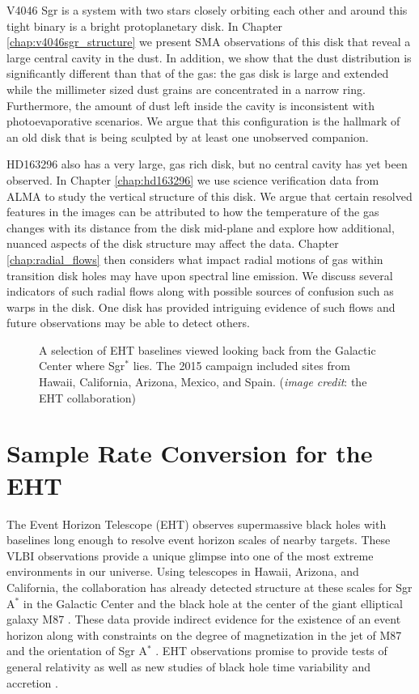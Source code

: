 V4046 Sgr is a system with two stars closely orbiting each other and around this tight binary is a bright
protoplanetary disk.  In Chapter \ref{chap:v4046sgr_structure} we present SMA observations 
of this disk that reveal a large central cavity in the dust.  In addition, we show that the dust 
distribution is significantly different than that of the gas: the gas disk is large and extended while the 
millimeter sized dust grains are concentrated in a narrow ring.  Furthermore, the amount of dust left inside
the cavity is inconsistent with photoevaporative scenarios.  We argue 
that this configuration is the hallmark of an old disk that is being sculpted by at least one unobserved 
companion. 

HD163296 also has a very large, gas rich disk, but no central cavity has yet been observed.  In Chapter 
\ref{chap:hd163296} 
we use science verification data from ALMA to study the vertical structure of 
this disk.  We argue that certain resolved features in the images can be attributed to how the temperature of 
the gas changes with
its distance from the disk mid-plane and explore how additional, nuanced aspects of the disk structure may affect
the data.  Chapter \ref{chap:radial_flows} then considers what impact radial motions of gas within transition 
disk holes may have upon spectral line emission.  We discuss several indicators of such radial flows along 
with possible sources of confusion such as warps in the disk.  One disk has provided intriguing
evidence of such flows \citep{casassus13,casassus15} and future observations may be able to detect others.

\begin{figure}[t]
\caption{A selection of EHT baselines viewed looking back from the Galactic Center where Sgr$^\ast$ lies.  The 
2015 campaign included sites 
from Hawaii, California, Arizona, Mexico, and Spain. ({\it image credit}: the EHT collaboration)}
\label{fig:eht_baselines}
\end{figure}

\section{Sample Rate Conversion for the EHT}

The Event Horizon Telescope (EHT) observes supermassive black holes with baselines long enough
to resolve event horizon scales of nearby targets.  These VLBI observations provide a 
unique glimpse into one of the most extreme environments in our universe.  Using telescopes in Hawaii, Arizona, 
and California, the collaboration has already detected structure at these scales for Sgr A$^\ast$ in the Galactic 
Center and the black hole at the center of the giant elliptical galaxy M87 
\citep{doeleman08,doeleman09}.  These data provide indirect 
evidence for the existence of an event horizon \citep{broderick15} along with constraints on the degree of 
magnetization in the jet of M87 \citep{kino15} and the orientation of Sgr A$^\ast$ \citep{broderick11}.  EHT 
observations promise to provide tests of general relativity \citep{luminet79,johannsen10,bambi13,broderick14} as 
well as new studies of black hole time variability \citep{doeleman09} and accretion \citep{chan15}.

